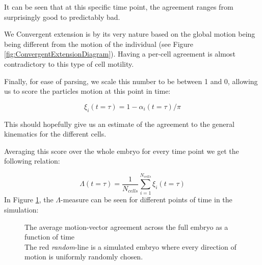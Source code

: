 It can be seen that at this specific time point, the agreement ranges from surprisingly good to predictably bad. 

We Convergent extension is by its very nature based on the global motion being being different from the motion of the individual (see Figure \ref{fig:ConvergentExtensionDiagram}). Having a per-cell agreement is almost contradictory to this type of cell motility. 





Finally, for ease of parsing, we scale this number to be between 1 and 0, allowing us to score the particles motion at this point in time:

\begin{equation}
    \xi_i(t=\tau) = 1-\alpha_i(t=\tau)/\pi
\end{equation}

This should hopefully give us an estimate of the agreement to the general kinematics for the different cells.


Averaging this score over the whole embryo for every time point we get the following relation:

\begin{equation}
     \Lambda(t=\tau) = \frac{1}{N_{cells}} \sum_{i=1}^{N_{cells}}\xi_i(t=\tau)
\end{equation}
In Figure \ref{fig:motionAgreement}, the $ \Lambda$-measure can be seen for different points of time in the simulation:

\begin{figure}[H]
    \centering
    \caption{The average motion-vector agreement across the full embryo as a function of time\\
    The red \textit{random}-line is a simulated embryo where every direction of motion is uniformly randomly chosen. }
    \label{fig:motionAgreement}
\end{figure}

